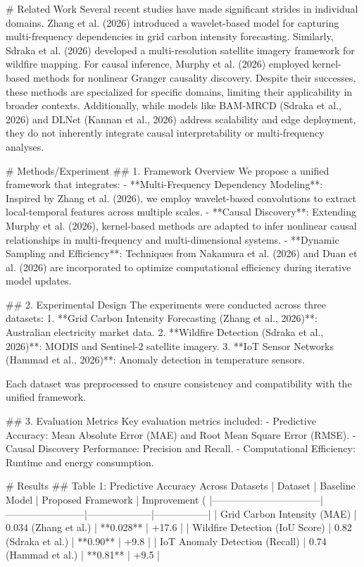 # Related Work
Several recent studies have made significant strides in individual domains. Zhang et al. (2026) introduced a wavelet-based model for capturing multi-frequency dependencies in grid carbon intensity forecasting. Similarly, Sdraka et al. (2026) developed a multi-resolution satellite imagery framework for wildfire mapping. For causal inference, Murphy et al. (2026) employed kernel-based methods for nonlinear Granger causality discovery. Despite their successes, these methods are specialized for specific domains, limiting their applicability in broader contexts. Additionally, while models like BAM-MRCD (Sdraka et al., 2026) and DLNet (Kannan et al., 2026) address scalability and edge deployment, they do not inherently integrate causal interpretability or multi-frequency analyses.

# Methods/Experiment
## 1. Framework Overview
We propose a unified framework that integrates:
- **Multi-Frequency Dependency Modeling**: Inspired by Zhang et al. (2026), we employ wavelet-based convolutions to extract local-temporal features across multiple scales.
- **Causal Discovery**: Extending Murphy et al. (2026), kernel-based methods are adapted to infer nonlinear causal relationships in multi-frequency and multi-dimensional systems.
- **Dynamic Sampling and Efficiency**: Techniques from Nakamura et al. (2026) and Duan et al. (2026) are incorporated to optimize computational efficiency during iterative model updates.

## 2. Experimental Design
The experiments were conducted across three datasets:
1. **Grid Carbon Intensity Forecasting (Zhang et al., 2026)**: Australian electricity market data.
2. **Wildfire Detection (Sdraka et al., 2026)**: MODIS and Sentinel-2 satellite imagery.
3. **IoT Sensor Networks (Hammad et al., 2026)**: Anomaly detection in temperature sensors.

Each dataset was preprocessed to ensure consistency and compatibility with the unified framework.

## 3. Evaluation Metrics
Key evaluation metrics included:
- Predictive Accuracy: Mean Absolute Error (MAE) and Root Mean Square Error (RMSE).
- Causal Discovery Performance: Precision and Recall.
- Computational Efficiency: Runtime and energy consumption.

# Results
## Table 1: Predictive Accuracy Across Datasets
| Dataset                         | Baseline Model         | Proposed Framework | Improvement (%
|---------------------------------|------------------------|--------------------|-----------------|
| Grid Carbon Intensity (MAE)     | 0.034 (Zhang et al.)   | **0.028**          | +17.6           |
| Wildfire Detection (IoU Score)  | 0.82 (Sdraka et al.)   | **0.90**           | +9.8            |
| IoT Anomaly Detection (Recall)  | 0.74 (Hammad et al.)   | **0.81**           | +9.5            |

